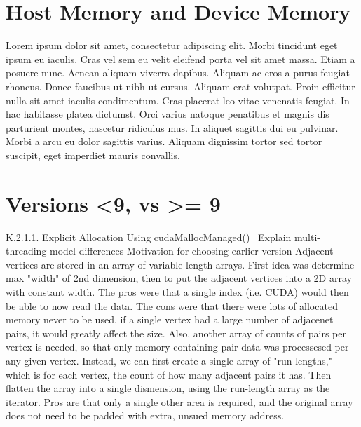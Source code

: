 \documentclass[openany]{book}
\begin{document}
\section{Host Memory and Device Memory}
Lorem ipsum dolor sit amet, consectetur adipiscing elit. Morbi tincidunt eget 
ipsum eu iaculis. Cras vel sem eu velit eleifend porta vel sit amet massa. Etiam 
a posuere nunc. Aenean aliquam viverra dapibus. Aliquam ac eros a purus feugiat 
rhoncus. Donec faucibus ut nibh ut cursus. Aliquam erat volutpat. Proin efficitur 
nulla sit amet iaculis condimentum. Cras placerat leo vitae venenatis feugiat. In 
hac habitasse platea dictumst. Orci varius natoque penatibus et magnis dis 
parturient montes, nascetur ridiculus mus. In aliquet sagittis dui eu pulvinar. 
Morbi a arcu eu dolor sagittis varius. Aliquam dignissim tortor sed tortor 
suscipit, eget imperdiet mauris convallis.~\cite[p.~00]{SourceNeeded}



\section{Versions <9, vs >= 9}
K.2.1.1. Explicit Allocation Using cudaMallocManaged()~\cite[p.~272]{CUDA18} 
Explain multi-threading model differences Motivation for choosing earlier 
version Adjacent vertices are stored in an array of variable-length arrays. 
First idea was determine max "width" of 2nd dimension, then to put the adjacent 
vertices into a 2D array with constant width. The pros were that a single index 
(i.e. CUDA) would then be able to now read the data.  The cons were that there 
were lots of allocated memory never to be used, if a single vertex had a large 
number of adjacenet pairs, it would greatly affect the size. Also, another 
array of counts of pairs per vertex is needed, so that only memory containing 
pair data was processesed per any given vertex. Instead, we can first create a 
single array of "run lengths," which is for each vertex, the count of how many 
adjacent pairs it has. Then flatten the array into a single dismension, using 
the run-length array as the iterator. Pros are that only a single other area is 
required, and the original array does not need to be padded with extra, unsued 
memory address.



\end{document}
